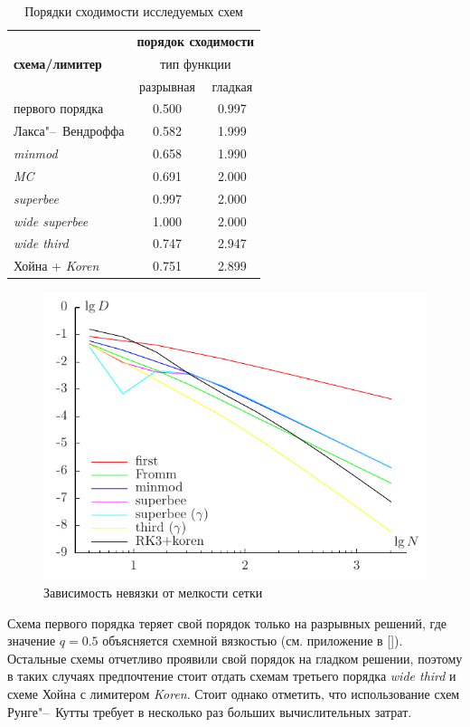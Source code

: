 \begin{table}
	\caption{Порядки сходимости исследуемых схем}\label{tab:q_value}
	\centering
	\begin{tabular}{l|c|c}
		\multirow{3}{*}{\bf схема/лимитер} & \multicolumn{2}{c}{\bf порядок сходимости} \\ \cline{2-3}
								& \multicolumn{2}{c}{тип функции} \\ \cline{2-3}
								& разрывная & гладкая \\ \hline
		первого порядка			& 0.500 	& 0.997 \\ \hline
		Лакса"--~Вендроффа		& 0.582 	& 1.999 \\ \hline
		\textit{minmod}			& 0.658 	& 1.990 \\ \hline
		\textit{MC}				& 0.691 	& 2.000 \\ \hline
		\textit{superbee}		& \color{olive}0.997 & 2.000 \\ \hline
		\textit{wide superbee}	& \color{olive}1.000 & 2.000 \\ \hline
		\textit{wide third}		& 0.747 	& \color{magenta}2.947 \\ \hline
		Хойна + \textit{Koren}	& 0.751 	& \color{magenta}2.899
	\end{tabular}
\end{table}

\begin{figure}
	\centering
	\includegraphics[width=.8\textwidth]{limiters/residual}
	\caption{Зависимость невязки от мелкости сетки}\label{fig:residual}
\end{figure}

Схема первого порядка теряет свой порядок только на разрывных решений,
где значение \(q=0.5\) объясняется схемной вязкостью (см. приложение в []).
Остальные схемы отчетливо проявили свой порядок на гладком решении,
поэтому в таких случаях предпочтение стоит отдать схемам третьего порядка \textit{wide third} и схеме Хойна с лимитером \textit{Koren}.
Стоит однако отметить, что использование схем Рунге"--~Кутты требует в несколько раз б\textit{о}льших вычислительных затрат.

